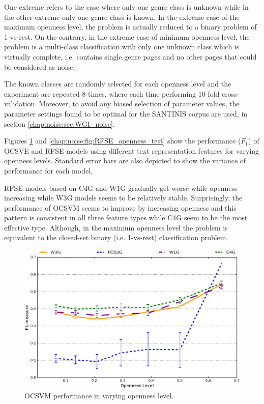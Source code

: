 One extreme refers to the case where only one genre class is unknown while in the other extreme only one genre class is known. In the extreme case of the maximum openness level, the problem is actually reduced to a binary problem of 1-vs-rest. On the contrary, in the extreme case of minimum openness level, the problem is a multi-class classification with only one unknown class which is virtually complete, i.e. contains single genre pages and no other pages that could be considered as noise.

The known classes are randomly selected for each openness level and the experiment are repeated 8 times, where each time performing 10-fold cross-validation. Moreover, to avoid any biased selection of parameter values, the parameter settings found to be optimal for the SANTINIS corpus are used, in section \ref{chap:noise:sec:WGI_noise}.

Figures \ref{chap:noise:fig:OCSVME_openness_test} and \ref{chap:noise:fig:RFSE_openness_test} show the performance ($F_{1}$) of OCSVE and RFSE models using different text representation features for varying openness levels. Standard error bars are also depicted to show the variance of performance for each model. 

RFSE models based on C4G and W1G gradually get worse while openness increasing while W3G models seems to be relatively stable. Surprisingly, the performance of OCSVM seems to improve by increasing openness and this pattern is consistent in all three feature types while C4G seem to be the most effective type. Although, in the maximum openness level the problem is equivalent to the closed-set binary (i.e. 1-vs-rest) classification problem.

\begin{figure}[H]
\begin{center}
    \includegraphics[scale=0.45]{Figures/OCSVME_openness_test_graph.eps}
	\caption{OCSVM performance in varying openness level.}
	\label{chap:noise:fig:OCSVME_openness_test}
\end{center}
\end{figure}

